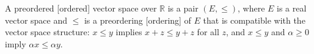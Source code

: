 A preordered [ordered] vector space over $\mathbb{R}$ is a pair $(E, \leq)$, where $E$ is a real vector space and $\leq$ is a preordering [ordering] of $E$ that is compatible with the vector space structure: $x \leq y$ implies $x + z \leq y + z$ for all $z$, and $x \leq y$ and $\alpha \geq 0$ imply $\alpha x \leq \alpha y$.